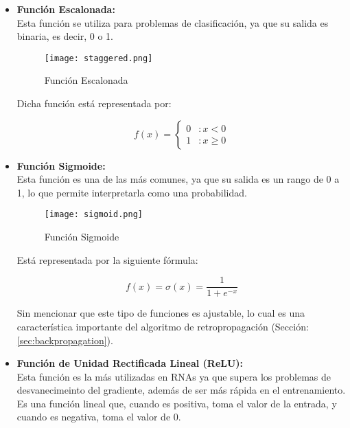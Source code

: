         \begin{itemize}
            \item \textbf{Función Escalonada:} \\
                Esta función se utiliza para problemas de clasificación, ya que su salida es binaria, es decir, 0 o 1.
                \begin{figure}[H]
                    \centering
                    \texttt{[image: staggered.png]}
                    \caption{Función Escalonada}
                    \label{fig:step_function}
                \end{figure}

                Dicha función está representada por:

                \[
                f(x) = \left\{ \begin{array}{lr} 
                0 & : x < 0 \\
                1 & : x \ge 0 
                \end{array} \right.
                \]
            
            \item \textbf{Función Sigmoide:} \\
                Esta función es una de las más comunes, ya que su salida es un rango de 0 a 1, lo que permite interpretarla como una probabilidad.
                \begin{figure}[H]
                    \centering
                    \texttt{[image: sigmoid.png]}
                    \caption{Función Sigmoide}
                    \label{fig:sigmoid_function}
                \end{figure}

                Está representada por la siguiente fórmula:

                \[
                f(x) = \sigma(x) =  \frac{1}{1 + e^{-x}}
                \]

                Sin mencionar que este tipo de funciones es ajustable, lo cual es una característica importante del algoritmo de retropropagación (Sección: \ref{sec:backpropagation}).
            
            \item \textbf{Función de Unidad Rectificada Lineal (ReLU):} \\
                Esta función es la más utilizadas en RNAs ya que supera los problemas de desvanecimeinto del gradiente, además de ser más rápida en el entrenamiento. \\
                Es una función lineal que, cuando es positiva, toma el valor de la entrada, y cuando es negativa, toma el valor de 0.


\end{itemize}
